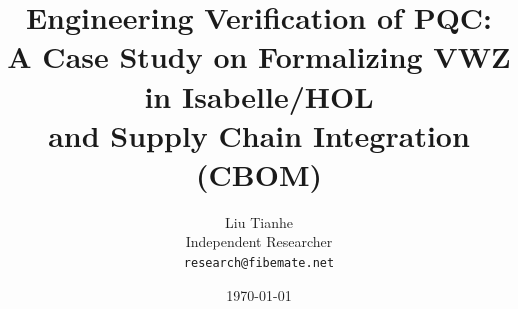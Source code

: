 \documentclass[11pt,a4paper]{article}
\title{Engineering Verification of PQC:\\[0.3em]
A Case Study on Formalizing VWZ in Isabelle/HOL\\[0.15em]
and Supply Chain Integration (CBOM)}
\author{%
  Liu Tianhe\\
  \small Independent Researcher\\
  \small \texttt{research@fibemate.net}
}
\date{\today}
\begin{document}
\maketitle

\begin{abstract}

\end{abstract}

\tableofcontents
\newpage









\appendix




\end{document}
